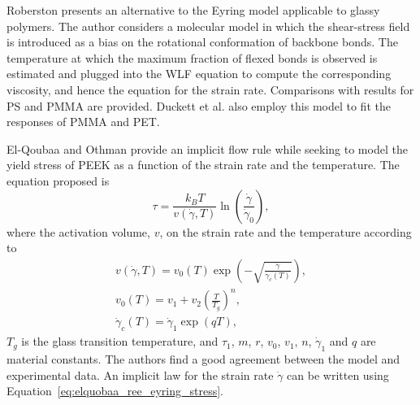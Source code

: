 
Roberston \citep{robertsonTheoryPlasticityGlassy1966} presents an alternative to the Eyring model applicable to glassy polymers.
The author considers a molecular model in which the shear-stress field is introduced as a bias on the rotational conformation of backbone bonds.
The temperature at which the maximum fraction of flexed bonds is observed is estimated and plugged into the WLF equation to compute the corresponding viscosity, and hence the equation for the strain rate.
Comparisons with results for PS and PMMA are provided.
Duckett et al. \citep{duckettStrainrateTemperaturePressure1970} also employ this model to fit the responses of PMMA and PET.

El-Qoubaa and Othman \citep{el-qoubaaStrainRateSensitivity2016} provide an implicit flow rule while seeking to model the yield stress of PEEK as a function of the strain rate and the temperature.
The equation proposed is
\begin{equation}
	\label{eq:elquobaa_ree_eyring_stress}
	\tau = \frac{k_B T}{v(\dot \gamma, T)}\ln\left(\frac{\dot\gamma}{\dot\gamma_0}\right),
\end{equation}
where the activation volume, $v$, on the strain rate and the temperature according to
\begin{gather}
	v(\dot\gamma, T) = v_0(T)\exp\left(-\sqrt{\frac{\dot\gamma}{\dot \gamma_c(T)} }\right),\\
	v_0(T) = v_1 + v_2 \left(\frac{T}{T_g}\right)^n,\\
	\dot \gamma_c (T) = \dot \gamma_1 \exp(q T),
\end{gather}
$T_g$ is the glass transition temperature, and $\tau_1$, $m$, $r$, $v_0$, $v_1$, $n$, $\dot\gamma_1$ and $q$ are material constants.
The authors find a good agreement between the model and experimental data.
An implicit law for the strain rate $\dot \gamma$ can be written using Equation~\eqref{eq:elquobaa_ree_eyring_stress}.

